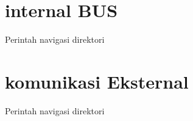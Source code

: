 \section{internal BUS}
Perintah navigasi direktori

\section{komunikasi Eksternal}
Perintah navigasi direktori


